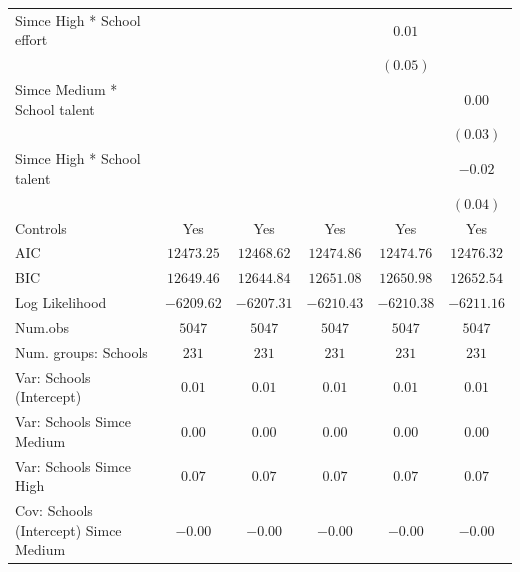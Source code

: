 \documentclass[
  12pt,
  letterpaper,
]{article}
\begin{document}
\begin{table}
{\begin{center}
{\begin{threeparttable}
\begin{tabular}{l c c c c c}
\quad Simce High * School effort          &               &               &               & $0.01$        &               \\
                                          &               &               &               & $(0.05)$      &               \\
\quad Simce Medium * School talent        &               &               &               &               & $0.00$        \\
                                          &               &               &               &               & $(0.03)$      \\
\quad Simce High * School talent          &               &               &               &               & $-0.02$       \\
                                          &               &               &               &               & $(0.04)$      \\
\midrule
Controls                                  & Yes           & Yes           & Yes           & Yes           & Yes           \\
AIC                                       & $12473.25$    & $12468.62$    & $12474.86$    & $12474.76$    & $12476.32$    \\
BIC                                       & $12649.46$    & $12644.84$    & $12651.08$    & $12650.98$    & $12652.54$    \\
Log Likelihood                            & $-6209.62$    & $-6207.31$    & $-6210.43$    & $-6210.38$    & $-6211.16$    \\
Num.obs                                   & $5047$        & $5047$        & $5047$        & $5047$        & $5047$        \\
Num. groups: Schools                      & $231$         & $231$         & $231$         & $231$         & $231$         \\
Var: Schools (Intercept)                  & $0.01$        & $0.01$        & $0.01$        & $0.01$        & $0.01$        \\
Var: Schools Simce Medium                 & $0.00$        & $0.00$        & $0.00$        & $0.00$        & $0.00$        \\
Var: Schools Simce High                   & $0.07$        & $0.07$        & $0.07$        & $0.07$        & $0.07$        \\
Cov: Schools (Intercept) Simce Medium     & $-0.00$       & $-0.00$       & $-0.00$       & $-0.00$       & $-0.00$       \\

\end{tabular}
\end{threeparttable}}
\end{center}}
\end{table}
\end{document}
